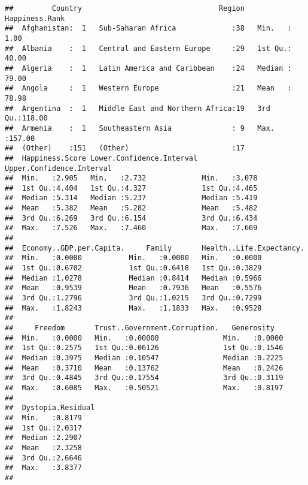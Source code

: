 \documentclass[]{article}
\begin{document}
\begin{verbatim}
##         Country                                Region   Happiness.Rank  
##  Afghanistan:  1   Sub-Saharan Africa             :38   Min.   :  1.00  
##  Albania    :  1   Central and Eastern Europe     :29   1st Qu.: 40.00  
##  Algeria    :  1   Latin America and Caribbean    :24   Median : 79.00  
##  Angola     :  1   Western Europe                 :21   Mean   : 78.98  
##  Argentina  :  1   Middle East and Northern Africa:19   3rd Qu.:118.00  
##  Armenia    :  1   Southeastern Asia              : 9   Max.   :157.00  
##  (Other)    :151   (Other)                        :17                   
##  Happiness.Score Lower.Confidence.Interval Upper.Confidence.Interval
##  Min.   :2.905   Min.   :2.732             Min.   :3.078            
##  1st Qu.:4.404   1st Qu.:4.327             1st Qu.:4.465            
##  Median :5.314   Median :5.237             Median :5.419            
##  Mean   :5.382   Mean   :5.282             Mean   :5.482            
##  3rd Qu.:6.269   3rd Qu.:6.154             3rd Qu.:6.434            
##  Max.   :7.526   Max.   :7.460             Max.   :7.669            
##                                                                     
##  Economy..GDP.per.Capita.     Family       Health..Life.Expectancy.
##  Min.   :0.0000           Min.   :0.0000   Min.   :0.0000          
##  1st Qu.:0.6702           1st Qu.:0.6418   1st Qu.:0.3829          
##  Median :1.0278           Median :0.8414   Median :0.5966          
##  Mean   :0.9539           Mean   :0.7936   Mean   :0.5576          
##  3rd Qu.:1.2796           3rd Qu.:1.0215   3rd Qu.:0.7299          
##  Max.   :1.8243           Max.   :1.1833   Max.   :0.9528          
##                                                                    
##     Freedom       Trust..Government.Corruption.   Generosity    
##  Min.   :0.0000   Min.   :0.00000               Min.   :0.0000  
##  1st Qu.:0.2575   1st Qu.:0.06126               1st Qu.:0.1546  
##  Median :0.3975   Median :0.10547               Median :0.2225  
##  Mean   :0.3710   Mean   :0.13762               Mean   :0.2426  
##  3rd Qu.:0.4845   3rd Qu.:0.17554               3rd Qu.:0.3119  
##  Max.   :0.6085   Max.   :0.50521               Max.   :0.8197  
##                                                                 
##  Dystopia.Residual
##  Min.   :0.8179   
##  1st Qu.:2.0317   
##  Median :2.2907   
##  Mean   :2.3258   
##  3rd Qu.:2.6646   
##  Max.   :3.8377   
## 
\end{verbatim}
\end{document}

